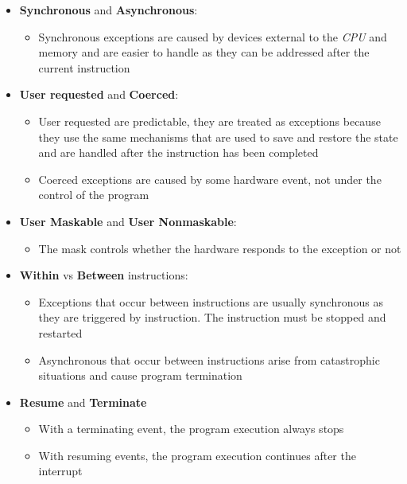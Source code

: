 \documentclass[english]{article}
\begin{document}
\begin{itemize}
  \item \textbf{Synchronous} and \textbf{Asynchronous}:
        \begin{itemize}
          \item Synchronous exceptions are caused by devices external to the \textit{CPU} and memory and are easier to handle as they can be addressed after the current instruction
        \end{itemize}
  \item \textbf{User requested} and \textbf{Coerced}:
        \begin{itemize}
          \item User requested are predictable, they are treated as exceptions because they use the same mechanisms that are used to save and restore the state and are handled after the instruction has been completed
          \item Coerced exceptions are caused by some hardware event, not under the control of the program
        \end{itemize}
  \item \textbf{User Maskable} and \textbf{User Nonmaskable}:
        \begin{itemize}
          \item The mask controls whether the hardware responds to the exception or not
        \end{itemize}
  \item \textbf{Within} vs \textbf{Between} instructions:
        \begin{itemize}
          \item Exceptions that occur between instructions are usually synchronous as they are triggered by instruction. The instruction must be stopped and restarted
          \item Asynchronous that occur between instructions arise from catastrophic situations and cause program termination
        \end{itemize}
  \item \textbf{Resume} and \textbf{Terminate}
        \begin{itemize}
          \item With a terminating event, the program execution always stops
          \item With resuming events, the program execution continues after the interrupt
        \end{itemize}
\end{itemize}
\end{document}
